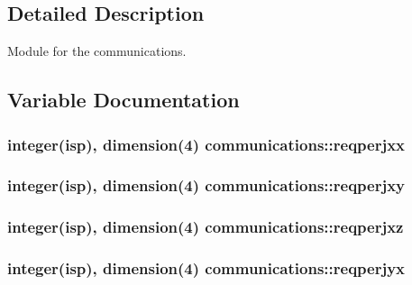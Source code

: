 \subsection{Detailed Description}
Module for the communications. 

\subsection{Variable Documentation}
\subsubsection[{\texorpdfstring{reqperjxx}{reqperjxx}}]{\setlength{\rightskip}{0pt plus 5cm}integer(isp), dimension(4) communications\+::reqperjxx}\hypertarget{namespacecommunications_ab09f2571f6d9283fbc47609b3e6de32a}{}\label{namespacecommunications_ab09f2571f6d9283fbc47609b3e6de32a}
\subsubsection[{\texorpdfstring{reqperjxy}{reqperjxy}}]{\setlength{\rightskip}{0pt plus 5cm}integer(isp), dimension(4) communications\+::reqperjxy}\hypertarget{namespacecommunications_a579ce4f6ca8641ffb00fd802371714c3}{}\label{namespacecommunications_a579ce4f6ca8641ffb00fd802371714c3}
\subsubsection[{\texorpdfstring{reqperjxz}{reqperjxz}}]{\setlength{\rightskip}{0pt plus 5cm}integer(isp), dimension(4) communications\+::reqperjxz}\hypertarget{namespacecommunications_afa5731d4931bff540f2d1e62849afb6c}{}\label{namespacecommunications_afa5731d4931bff540f2d1e62849afb6c}
\subsubsection[{\texorpdfstring{reqperjyx}{reqperjyx}}]{\setlength{\rightskip}{0pt plus 5cm}integer(isp), dimension(4) communications\+::reqperjyx}\hypertarget{namespacecommunications_a44e505738aca0afddea17f1b8800be28}{}\label{namespacecommunications_a44e505738aca0afddea17f1b8800be28}
